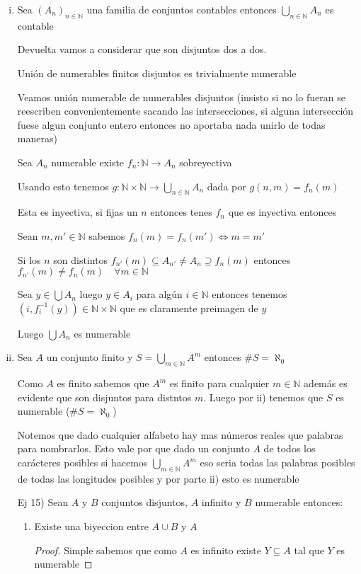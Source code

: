 \documentclass[12pt]{article}
\newcommand{\n}{\aleph_{0}}
\newcommand{\N}{\mathbb{N}}
\newcommand{\ra}{\rightarrow}
\theoremstyle{definition}
\begin{document}
\begin{enumerate}[i.]
  \item Sea $(A_{n})_{n \in \N}$ una familia de conjuntos contables entonces $\bigcup_{n \in \N} A_{n}$ es contable
  
    Devuelta vamos a considerar que son disjuntos dos a dos.

    Unión de numerables finitos disjuntos es trivialmente numerable

    Veamos unión numerable de numerables disjuntos (insisto si no lo fueran se reescriben convenientemente sacando las intersecciones, si alguna intersección fuese algun conjunto entero entonces no aportaba nada unirlo de todas maneras)

    Sea $A_{n}$ numerable existe $f_{n}: \N \ra A_{n}$ sobreyectiva

    Usando esto tenemos $g: \N \times \N \ra \bigcup_{n \in \N} A_{n}$ dada por $g(n,m) = f_{n}(m)$

    Esta es inyectiva, si fijas un $n$ entonces tenes $f_{n}$ que es inyectiva entonces 

    Sean $m , m' \in \N $ sabemos $f_{n}(m) = f_{n}(m') \iff m = m'$ 

    Si los $n$ son distintos $f_{n'}(m) \subseteq A_{n'} \neq A_{n} \supseteq f_{n}(m) $ entonces $f_{n'}(m) \neq f_{n}(m) \quad \forall m \in \N $

    Sea $y \in \bigcup A_{n}$ luego $y \in A_{i}$ para algún $i \in \N$ entonces tenemos $(i ,f^{-1}_{i} (y)) \in \N \times \N$ que es claramente preimagen de $y$

    Luego $\bigcup A_{n}$ es numerable

  \item Sea $A$ un conjunto finito y $S = \bigcup_{m \in \N} A^{m}$ entonces $\# S = \n$  

  Como $A$ es finito sabemos que $A^m$ es finito para cualquier $m \in \N$ además es evidente que son disjuntos para distntos $m$. Luego por ii) tenemos que $S$ es numerable ($\# S = \n$)

Notemos que dado cualquier alfabeto hay mas números reales que palabras para nombrarlos. Esto vale por que dado un conjunto $A$ de todos los carácteres posibles si hacemos $\bigcup_{m \in \N}A^{m}$ eso seria todas las palabras posibles de todas las longitudes posibles y por parte ii) esto es numerable


Ej 15) Sean $A$ y $B$ conjuntos disjuntos, $A$ infinito y $B$ numerable entonces:
\begin{enumerate}
  \item Existe una biyeccion entre $A \cup B$ y $A$
    \begin{proof} 
    Simple sabemos que como $A$ es infinito existe $Y \subseteq A$ tal que $Y$ es numerable


\end{proof}
\end{enumerate}
\end{enumerate}
\end{document}
